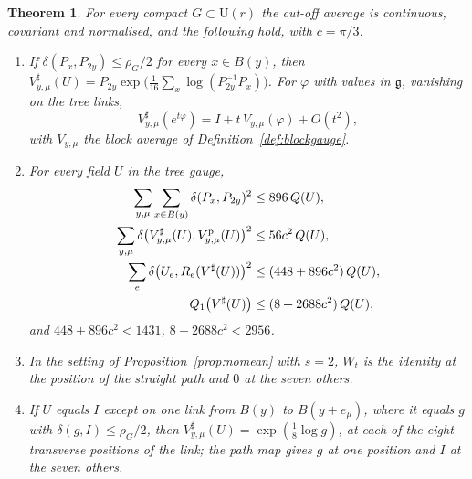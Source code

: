 \documentclass[11pt]{amsart}
\newtheorem{theorem}{Theorem}[section]
\theoremstyle{definition}
\theoremstyle{remark}
\numberwithin{equation}{section}
\newcommand{\U}{\mathrm{U}}
\begin{document}
\begin{theorem}\label{thm:cutoff}
For every compact $G\subset\U(r)$ the cut-off average is continuous,
covariant and normalised, and the following hold, with $c=\pi/3$.
\begin{enumerate}[label=\textup{(\roman*)},leftmargin=*]
\item If $\delta(P_x,P_{2y})\le\rho_G/2$ for every $x\in B(y)$, then
$V^\sharp_{y,\mu}(U)=P_{2y}\exp\bigl(\frac1{16}\sum_x\log(P_{2y}^{-1}P_x)
\bigr)$. For $\varphi$ with values in $\mathfrak g$, vanishing on the tree
links,
\[
V^\sharp_{y,\mu}(e^{t\varphi})=I+t\,V_{y,\mu}(\varphi)+O(t^2),
\]
with $V_{y,\mu}$ the block average of Definition~\ref{def:blockgauge}.
\item For every field $U$ in the tree gauge,
\begin{align*}
\sum_{y,\mu}\sum_{x\in B(y)}\delta(P_x,P_{2y})^2&\le896\,Q(U),\\
\sum_{y,\mu}\delta\bigl(V^\sharp_{y,\mu}(U),V^{\rm p}_{y,\mu}(U)\bigr)^2
&\le56c^2\,Q(U),\\
\sum_e\delta\bigl(U_e,R_e(V^\sharp(U))\bigr)^2&\le(448+896c^2)\,Q(U),\\
Q_1\bigl(V^\sharp(U)\bigr)&\le(8+2688c^2)\,Q(U),
\end{align*}
and $448+896c^2<1431$, $8+2688c^2<2956$.
\item In the setting of Proposition~\ref{prop:nomean} with $s=2$, $W_t$ is
the identity at the position of the straight path and $0$ at the seven
others.
\item If $U$ equals $I$ except on one link from $B(y)$ to $B(y+e_\mu)$,
where it equals $g$ with $\delta(g,I)\le\rho_G/2$, then $V^\sharp_{y,\mu}(U)=
\exp(\frac18\log g)$, at each of the eight transverse positions of the link;
the path map gives $g$ at one position and $I$ at the seven others.
\end{enumerate}
\end{theorem}
\end{document}

